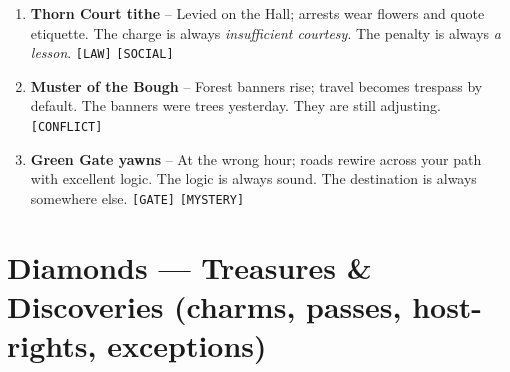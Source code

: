 \begin{enumerate}
\item[Q] \textbf{Thorn Court tithe} -- Levied on the Hall; arrests wear flowers and quote etiquette. The charge is always \emph{insufficient courtesy}. The penalty is always \emph{a lesson}. \texttt{[LAW]} \texttt{[SOCIAL]}
\item[K] \textbf{Muster of the Bough} -- Forest banners rise; travel becomes trespass by default. The banners were trees yesterday. They are still adjusting. \texttt{[CONFLICT]}
\item[A] \textbf{Green Gate yawns} -- At the wrong hour; roads rewire across your path with excellent logic. The logic is always sound. The destination is always somewhere else. \texttt{[GATE]} \texttt{[MYSTERY]}
\end{enumerate}

\section*{Diamonds --- Treasures \& Discoveries (charms, passes, host-rights, exceptions)}
\label{sec:aelinnel-rewards}
